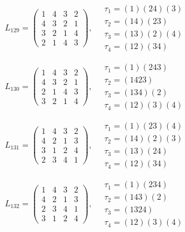$L_{129} = \begin{pmatrix} 1 & 4 & 3 & 2 \\ 4 & 3 & 2 & 1 \\ 3 & 2 & 1 & 4 \\ 2 & 1 & 4 & 3 \end{pmatrix}, \quad \begin{matrix} \tau_{1} = (1)(2 4)(3) \\ \tau_{2} = (1 4)(2 3) \\ \tau_{3} = (1 3)(2)(4) \\ \tau_{4} = (1 2)(3 4) \end{matrix}$

$L_{130} = \begin{pmatrix} 1 & 4 & 3 & 2 \\ 4 & 3 & 2 & 1 \\ 2 & 1 & 4 & 3 \\ 3 & 2 & 1 & 4 \end{pmatrix}, \quad \begin{matrix} \tau_{1} = (1)(2 4 3) \\ \tau_{2} = (1 4 2 3) \\ \tau_{3} = (1 3 4)(2) \\ \tau_{4} = (1 2)(3)(4) \end{matrix}$

$L_{131} = \begin{pmatrix} 1 & 4 & 3 & 2 \\ 4 & 2 & 1 & 3 \\ 3 & 1 & 2 & 4 \\ 2 & 3 & 4 & 1 \end{pmatrix}, \quad \begin{matrix} \tau_{1} = (1)(2 3)(4) \\ \tau_{2} = (1 4)(2)(3) \\ \tau_{3} = (1 3)(2 4) \\ \tau_{4} = (1 2)(3 4) \end{matrix}$

$L_{132} = \begin{pmatrix} 1 & 4 & 3 & 2 \\ 4 & 2 & 1 & 3 \\ 2 & 3 & 4 & 1 \\ 3 & 1 & 2 & 4 \end{pmatrix}, \quad \begin{matrix} \tau_{1} = (1)(2 3 4) \\ \tau_{2} = (1 4 3)(2) \\ \tau_{3} = (1 3 2 4) \\ \tau_{4} = (1 2)(3)(4) \end{matrix}$

